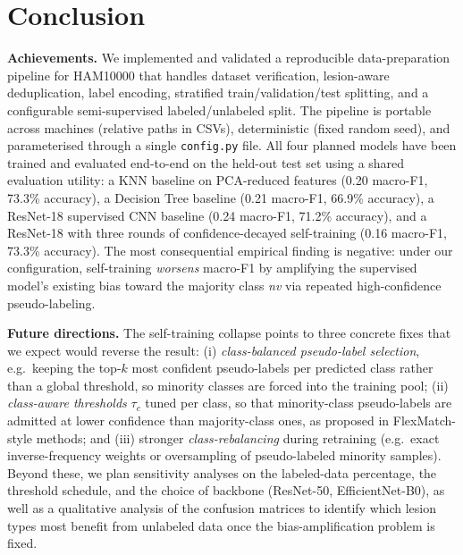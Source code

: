 \documentclass[conference]{IEEEtran}
\begin{document}
\section{Conclusion}
\label{sec:conclusion}
\textbf{Achievements.} We implemented and validated a reproducible
data-preparation pipeline for HAM10000 that handles dataset
verification, lesion-aware deduplication, label encoding, stratified
train/validation/test splitting, and a configurable semi-supervised
labeled/unlabeled split. The pipeline is portable across machines
(relative paths in CSVs), deterministic (fixed random seed), and
parameterised through a single \texttt{config.py} file. All four
planned models have been trained and evaluated end-to-end on the
held-out test set using a shared evaluation utility: a KNN baseline
on PCA-reduced features (0.20 macro-F1, 73.3\% accuracy), a Decision
Tree baseline (0.21 macro-F1, 66.9\% accuracy), a ResNet-18
supervised CNN baseline (0.24 macro-F1, 71.2\% accuracy), and a
ResNet-18 with three rounds of confidence-decayed self-training
(0.16 macro-F1, 73.3\% accuracy). The most consequential empirical
finding is negative: under our configuration, self-training
\emph{worsens} macro-F1 by amplifying the supervised model's
existing bias toward the majority class \emph{nv} via repeated
high-confidence pseudo-labeling.

\textbf{Future directions.} The self-training collapse points to
three concrete fixes that we expect would reverse the result: (i)
\emph{class-balanced pseudo-label selection}, e.g.\ keeping the
top-$k$ most confident pseudo-labels per predicted class rather than
a global threshold, so minority classes are forced into the training
pool; (ii) \emph{class-aware thresholds} $\tau_c$ tuned per class, so
that minority-class pseudo-labels are admitted at lower confidence
than majority-class ones, as proposed in FlexMatch-style methods;
and (iii) stronger \emph{class-rebalancing} during retraining (e.g.\
exact inverse-frequency weights or oversampling of pseudo-labeled
minority samples). Beyond these, we plan sensitivity analyses on the
labeled-data percentage, the threshold schedule, and the choice of
backbone (ResNet-50, EfficientNet-B0), as well as a qualitative
analysis of the confusion matrices to identify which lesion types
most benefit from unlabeled data once the bias-amplification problem
is fixed.
\end{document}
